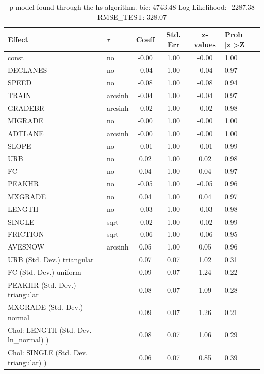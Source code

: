 \begin{table}
	\caption{p model found through the hs algorithm. bic: 4743.48 Log-Likelihood: -2287.38 RMSE_TEST: 328.07}
	\begin{center}
		\begin{tabular}{|l|l|c|c|c|l|}
			\hline
			Effect & $\tau$ & Coeff & Std. Err & z-values & Prob |z|>Z \\
			\hline
			const & no & -0.00 & 1.00 & -0.00 & 1.00 \\
			\hline
			DECLANES & no & -0.04 & 1.00 & -0.04 & 0.97 \\
			\hline
			SPEED & no & -0.08 & 1.00 & -0.08 & 0.94 \\
			\hline
			TRAIN & arcsinh & -0.04 & 1.00 & -0.04 & 0.97 \\
			\hline
			GRADEBR & arcsinh & -0.02 & 1.00 & -0.02 & 0.98 \\
			\hline
			MIGRADE & no & -0.00 & 1.00 & -0.00 & 1.00 \\
			\hline
			ADTLANE & arcsinh & -0.00 & 1.00 & -0.00 & 1.00 \\
			\hline
			SLOPE & no & -0.01 & 1.00 & -0.01 & 0.99 \\
			\hline
			URB & no & 0.02 & 1.00 & 0.02 & 0.98 \\
			\hline
			FC & no & 0.04 & 1.00 & 0.04 & 0.97 \\
			\hline
			PEAKHR & no & -0.05 & 1.00 & -0.05 & 0.96 \\
			\hline
			MXGRADE & no & 0.04 & 1.00 & 0.04 & 0.97 \\
			\hline
			LENGTH & no & -0.03 & 1.00 & -0.03 & 0.98 \\
			\hline
			SINGLE & sqrt & -0.02 & 1.00 & -0.02 & 0.99 \\
			\hline
			FRICTION & sqrt & -0.06 & 1.00 & -0.06 & 0.95 \\
			\hline
			AVESNOW & arcsinh & 0.05 & 1.00 & 0.05 & 0.96 \\
			\hline
			URB (Std. Dev.) triangular &  & 0.07 & 0.07 & 1.02 & 0.31 \\
			\hline
			FC (Std. Dev.) uniform &  & 0.09 & 0.07 & 1.24 & 0.22 \\
			\hline
			PEAKHR (Std. Dev.) triangular &  & 0.08 & 0.07 & 1.09 & 0.28 \\
			\hline
			MXGRADE (Std. Dev.) normal &  & 0.09 & 0.07 & 1.26 & 0.21 \\
			\hline
			 Chol: LENGTH (Std. Dev. ln_normal) ) &  & 0.08 & 0.07 & 1.06 & 0.29 \\
			\hline
			 Chol: SINGLE (Std. Dev. triangular) ) &  & 0.06 & 0.07 & 0.85 & 0.39 \\

\end{tabular}
\end{center}
\end{table}

